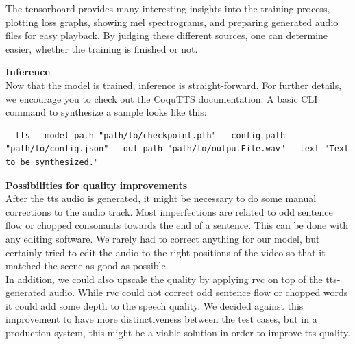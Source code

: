 \documentclass[
  a4paper,  %
  twoside,  %
  bibliography=totoc,
  headsepline,
  cleardoublepage=empty,
  parskip=half,
  draft=false
]{scrbook}
\begin{document}
The tensorboard provides many interesting insights into the training process, plotting loss graphs, showing mel spectrograms, and preparing generated audio files for easy playback. By judging these different sources, one can determine easier, whether the training is finished or not. 

\textbf{Inference} \\
Now that the model is trained, inference is straight-forward. For further details, we encourage you to check out the CoquTTS documentation. A basic CLI command to synthesize a sample looks like this:
\begin{lstlisting}
  tts --model_path "path/to/checkpoint.pth" --config_path "path/to/config.json" --out_path "path/to/outputFile.wav" --text "Text to be synthesized."
\end{lstlisting}

\textbf{Possibilities for quality improvements} \\
After the \gls{tts} audio is generated, it might be necessary to do some manual corrections to the audio track. Most imperfections are related to odd sentence flow or chopped consonants towards the end of a sentence. This can be done with any editing software. We rarely had to correct anything for our model, but certainly tried to edit the audio to the right positions of the video so that it matched the scene as good as possible. \\
In addition, we could also upscale the quality by applying \gls{rvc} on top of the \gls{tts}-generated audio. While \gls{rvc} could not correct odd sentence flow or chopped words it could add some depth to the speech quality. We decided against this improvement to have more distinctiveness between the test cases, but in a production system, this might be a viable solution in order to improve \gls{tts} quality. 
\end{document}
